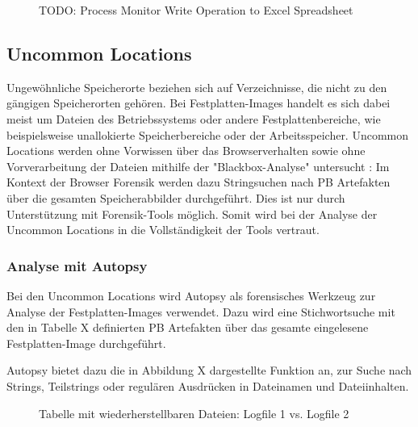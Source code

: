\begin{figure}[h!]
	\centering
	\small
	\centerline{\resizebox{\linewidth}{!}{}}
	\caption{TODO: Process Monitor Write Operation to Excel Spreadsheet}
	\label{fig:jes}
\end{figure}

\subsection{Uncommon Locations}
\label{subsection:methodik-datenanalyse-uncommonlocations}
Ungewöhnliche Speicherorte beziehen sich auf Verzeichnisse, die nicht zu den gängigen Speicherorten gehören. 
Bei Festplatten-Images handelt es sich dabei meist um Dateien des Betriebssystems oder andere Festplattenbereiche, wie beispielsweise unallokierte Speicherbereiche oder der Arbeitsspeicher.
Uncommon Locations werden ohne Vorwissen über das Browserverhalten sowie ohne Vorverarbeitung der Dateien mithilfe der "Blackbox-Analyse" untersucht \cite{Bonetti.2014}:
Im Kontext der Browser Forensik werden dazu Stringsuchen nach PB Artefakten über die gesamten Speicherabbilder durchgeführt.
Dies ist nur durch Unterstützung mit Forensik-Tools möglich. Somit wird bei der Analyse der Uncommon Locations in die Vollständigkeit der Tools vertraut.

\subsubsection*{Analyse mit Autopsy}
\label{subsubsection:methodik-datenanalyse-uncommonlocations-analysemitautopsy}
Bei den Uncommon Locations wird Autopsy als forensisches Werkzeug zur Analyse der Festplatten-Images verwendet.
Dazu wird eine Stichwortsuche mit den in Tabelle X definierten PB Artefakten über das gesamte eingelesene Festplatten-Image durchgeführt.

Autopsy bietet dazu die in Abbildung X dargestellte Funktion an, zur Suche nach Strings, Teilstrings oder regulären Ausdrücken in Dateinamen und Dateiinhalten.
\begin{figure}[h!]
	\centerline{}
	\caption{Tabelle mit wiederherstellbaren Dateien: Logfile 1 vs. Logfile 2}
\end{figure}

